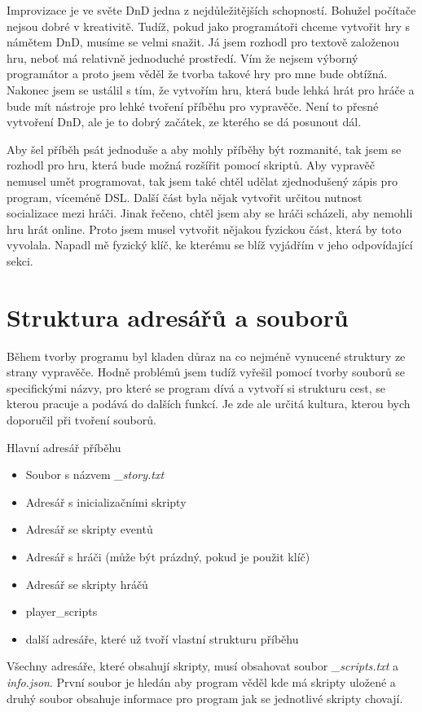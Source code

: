 \documentclass[12pt,a4paper]{article}
\begin{document}
Improvizace je ve světe DnD jedna z nejdůležitějších schopností. Bohužel počítače nejsou dobré v kreativitě. Tudíž, pokud jako programátoři chceme vytvořit hry s námětem DnD, musíme se velmi snažit. Já jsem rozhodl pro textově založenou hru, neboť má relativně jednoduché prostředí. Vím že nejsem výborný programátor a proto jsem věděl že tvorba takové hry pro mne bude obtížná. Nakonec jsem se ustálil s tím, že vytvořím hru, která bude lehká hrát pro hráče a bude mít nástroje pro lehké tvoření příběhu pro vypravěče. Není to přesné vytvoření DnD, ale je to dobrý začátek, ze kterého se dá posunout dál.

Aby šel příběh psát jednoduše a aby mohly příběhy být rozmanité, tak jsem se rozhodl pro hru, která bude možná rozšířit pomocí skriptů. Aby vypravěč nemusel umět programovat, tak jsem také chtěl udělat zjednodušený zápis pro program, víceméně DSL. Další část byla nějak vytvořit určitou nutnost socializace mezi hráči. Jinak řečeno, chtěl jsem aby se hráči scházeli, aby nemohli hru hrát online. Proto jsem musel vytvořit nějakou fyzickou část, která by toto vyvolala. Napadl mě fyzický klíč, ke kterému se blíž vyjádřím v jeho odpovídající sekci.

\newpage
\section{Struktura adresářů a souborů}
Během tvorby programu byl kladen důraz na co nejméně vynucené struktury ze strany vypravěče. Hodně problémů jsem tudíž vyřešil pomocí tvorby souborů se specifickými názvy, pro které se program dívá a vytvoří si strukturu cest, se kterou pracuje a podává do dalších funkcí. Je zde ale určitá kultura, kterou bych doporučil při tvoření souborů.

Hlavní adresář příběhu
\begin{itemize}
	\item Soubor s názvem \textit{\_story.txt}
	\item Adresář s inicializačními skripty
	\item Adresář se skripty eventů
	\item Adresář s hráči (může být prázdný, pokud je použit klíč)
	\item Adresář se skripty hráčů 
	\item player\_scripts
	\item další adresáře, které už tvoří vlastní strukturu příběhu
\end{itemize}

Všechny adresáře, které obsahují skripty, musí obsahovat soubor \textit{\_scripts.txt} a \textit{info.json}. První soubor je hledán aby program věděl kde má skripty uložené a druhý soubor obsahuje informace pro program jak se jednotlivé skripty chovají.
\end{document}
